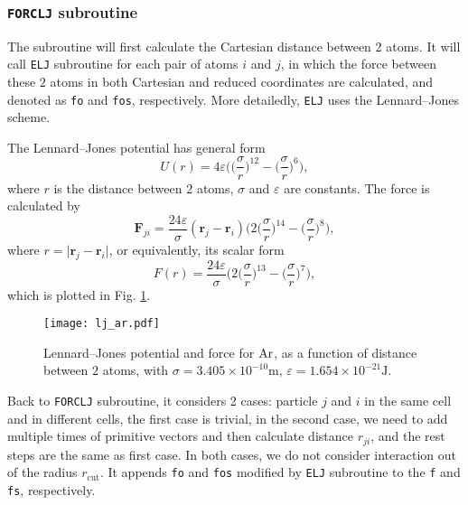 
\subsubsection{\texttt{FORCLJ} subroutine}
\label{sssec:forclj}

The subroutine will first calculate the Cartesian distance between 2 atoms.
It will call \texttt{ELJ} subroutine for each pair of atoms $i$ and $j$, in which
the force between these $2$ atoms in both Cartesian and reduced coordinates
are calculated, and denoted as \texttt{fo} and \texttt{fos}, respectively.
More detailedly, \texttt{ELJ} uses the Lennard--Jones scheme.

The Lennard--Jones potential has general form
\begin{equation}
 U(r) = 4\varepsilon \bigg( \Big( \frac{ \sigma }{ r } \Big) ^ {12} -
 \Big( \frac{ \sigma }{ r } \Big) ^ 6 \bigg),
\end{equation}
where $r$ is the distance between $2$ atoms, $\sigma$ and $\varepsilon$
are constants.
The force is calculated by
\begin{equation}
 \bm{F}_{ji} = \frac{ 24\varepsilon }{ \sigma } (\bm{r}_j - \bm{r}_i)
 \bigg( 2\Big( \frac{ \sigma }{ r } \Big) ^ {14} -
 \Big( \frac{ \sigma }{ r } \Big) ^ 8 \bigg),
\end{equation}
where $r = \lvert \bm{r}_j - \bm{r}_i \rvert$, or equivalently, its scalar form
\begin{equation}
 F(r) = \frac{ 24\varepsilon }{ \sigma }
 \bigg( 2\Big( \frac{ \sigma }{ r } \Big) ^ {13} -
 \Big( \frac{ \sigma }{ r } \Big) ^ 7 \bigg),
\end{equation}
which is plotted in Fig. \ref{fig:ljar}.

\begin{figure}[h]
 \centering
 \texttt{[image: lj\_ar.pdf]}
 \caption{Lennard--Jones potential and force for $\ce{Ar}$, as a function of
  distance between $2$ atoms, with
  $\sigma=3.405\times 10^{-10}\si{\meter}$,
  $\varepsilon = 1.654\times 10^{-21}\si{\joule}$.\cite{buffalomd}}
 \label{fig:ljar}
\end{figure}

Back to \texttt{FORCLJ} subroutine,
it considers 2 cases: particle $j$ and $i$ in the same cell and
in different cells, the first case is trivial, in the second case,
we need to add multiple times of primitive vectors and then calculate distance
$r_{ji}$, and the rest steps are the same as first case. In both cases, we do not
consider interaction out of the radius $r_{\text{cut}}$.
It appends \texttt{fo} and \texttt{fos} modified by \texttt{ELJ}
subroutine to the \texttt{f} and \texttt{fs}, respectively.
